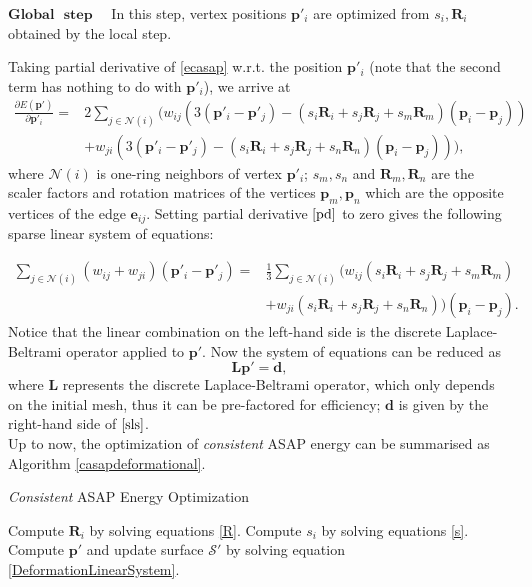 $\textbf{Global}$ $\textbf{ step}$ ~~In this step, vertex positions $\mathbf p'_i$ are optimized from $s_i, \mathbf R_i$ obtained by the local step.

Taking partial derivative of \eqref{ecasap} w.r.t. the position $\mathbf p'_i$ (note that the second term has nothing to do with $\mathbf p'_i$), we arrive at
\begin{align}\label{pd}
\frac{\partial E(\mathbf p')}{\partial \mathbf p'_i} =&2 \sum_{j \in \mathcal{N}(i)}\!(\!w_{ij}(3(\mathbf p'_i\!-\!\mathbf p'_j\!)\!-\!(\!s_i\mathbf R_i\!+\!s_j\mathbf R_j\!+\!s_m\mathbf R_m\!)(\mathbf p_i\!-\!\mathbf p_j\!))\nonumber\\
&+\!w_{ji}(3(\mathbf p'_i\!-\!\mathbf p'_j\!)\!-\!(s_i\mathbf R_i\!+\!s_j\mathbf R_j\!+\!s_n\mathbf R_n\!)(\mathbf p_i\!-\!\mathbf p_j\!))),
\end{align}
where $\mathcal{N}(i)$ is one-ring neighbors of vertex $\mathbf p'_i$; $s_m, s_n$ and $\mathbf R_m, \mathbf R_n$ are the scaler factors and rotation matrices of the vertices $\mathbf p_m, \mathbf p_n$ which are the opposite vertices of the edge $\mathbf e_{ij}$. Setting partial derivative $\eqref{pd}$ to zero gives the following sparse linear system of equations:

\begin{align}\label{sls}
\sum_{j \in \mathcal{N}(i)}(w_{ij}\!+\!w_{ji})(\mathbf p'_i-\mathbf p'_j)=&\frac{1}{3}\!\sum_{j \in \mathcal{N}(i)}\!(w_{ij}(s_i \mathbf R_i\!+\!s_j\mathbf R_j\!+\!s_m \mathbf R_m\!)\! \nonumber\\
&+\!w_{ji}(s_i \mathbf R_i\!+\!s_j \mathbf R_j\!+\!s_n \mathbf R_n))(\mathbf p_i\!-\!\mathbf p_j\!).
\end{align}
Notice that the linear combination on the left-hand side is the discrete Laplace-Beltrami operator applied to $\mathbf p'$. Now the system of equations can be reduced as \begin{equation}\label{DeformationLinearSystem}
\mathbf L\mathbf p' = \mathbf d,
\end{equation} where $\mathbf L$ represents the discrete Laplace-Beltrami operator, which only depends on the initial mesh, thus it can be pre-factored for efficiency; $\mathbf d$ is given by the right-hand side of $\eqref{sls}$.\\

Up to now, the optimization of \emph{consistent} ASAP energy can be summarised as Algorithm \eqref{casapdeformational}.
\begin{algorithm}[]
\caption{\emph{Consistent} ASAP Energy Optimization}
\label{casapdeformational}
\begin{algorithmic}[1]
        \State Compute $\mathbf R_i$ by solving equations \eqref{R}.
        \State Compute $s_i$ by solving equations \eqref{s}.
        \State Compute $\mathbf p'$ and update surface $\mathcal S'$ by solving equation \eqref{DeformationLinearSystem}.
    \EndWhile
\end{algorithmic}
\end{algorithm}

